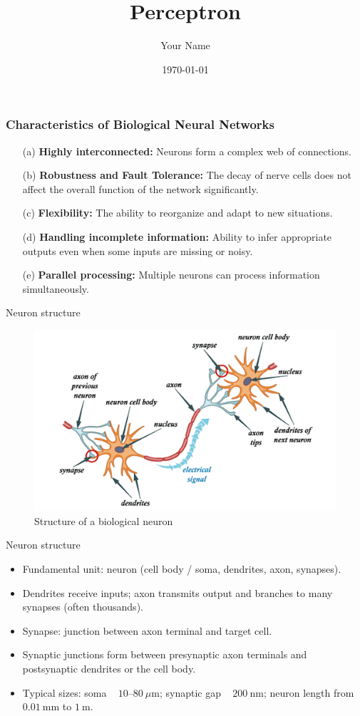 \documentclass{beamer}
\title{Perceptron}
\author{Your Name}
\date{\today}
\begin{document}
\begin{frame}
    \titlepage
\end{frame}

\begin{frame}
    \frametitle{Characteristics of Biological Neural Networks}
    \begin{itemize}
        \item[(a)] \textbf{Highly interconnected:} Neurons form a complex web of connections.
        \item[(b)] \textbf{Robustness and Fault Tolerance:} The decay of nerve cells does not affect the overall function of the network significantly.
        \item[(c)] \textbf{Flexibility:} The ability to reorganize and adapt to new situations.
        \item[(d)] \textbf{Handling incomplete information:} Ability to infer appropriate outputs even when some inputs are missing or noisy.
        \item[(e)] \textbf{Parallel processing:} Multiple neurons can process information simultaneously.

    \end{itemize}
\end{frame}

\begin{frame}{Neuron structure}
    \begin{figure}
        \includegraphics[width=0.8\linewidth]{figures/biological_neuron.png}
        \caption{Structure of a biological neuron}
    \end{figure}
\end{frame}

\begin{frame}{Neuron structure}
    \begin{itemize}
        \item Fundamental unit: neuron (cell body / soma, dendrites, axon, synapses).
        \item Dendrites receive inputs; axon transmits output and branches to many synapses (often thousands).
        \item Synapse: junction between axon terminal and target cell.
        \item Synaptic junctions form between presynaptic axon terminals and postsynaptic dendrites or the cell body.
        \item Typical sizes: soma ~ $10$--$80\ \mu$m; synaptic gap ~ $200\ \mathrm{nm}$; neuron length from $0.01\ \mathrm{mm}$ to $1\ \mathrm{m}$.
    \end{itemize}
\end{frame}
\end{document}
